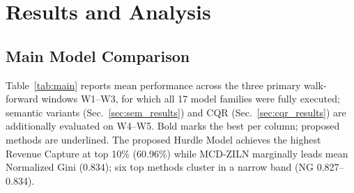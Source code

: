 \documentclass[pdflatex,sn-mathphys-num]{sn-jnl}
\theoremstyle{thmstyleone}
\theoremstyle{thmstyletwo}
\theoremstyle{thmstylethree}
\begin{document}
\section{Results and Analysis}\label{sec:results}

\subsection{Main Model Comparison}

Table~\ref{tab:main} reports mean performance across the three
primary walk-forward windows W1--W3, for which all 17 model families
were fully executed; semantic variants (Sec.~\ref{sec:sem_results})
and CQR (Sec.~\ref{sec:cqr_results}) are additionally evaluated on
W4--W5. Bold marks the best per column; proposed methods are
underlined. The proposed Hurdle Model achieves the highest
Revenue Capture at top 10\% (60.96\%) while MCD-ZILN marginally leads
mean Normalized Gini (0.834); six top methods cluster in a narrow band
(NG 0.827--0.834).
\end{document}

